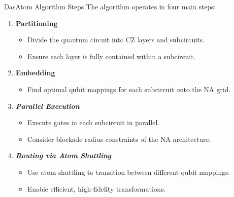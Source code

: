 \begin{frame}{DasAtom Algorithm Steps}
    The algorithm operates in four main steps:

    \begin{enumerate}
        \item \textbf{Partitioning}
            \begin{itemize}
                \item Divide the quantum circuit into CZ layers and subcircuits.
                \item Ensure each layer is fully contained within a subcircuit.
            \end{itemize}
        \item \textbf{Embedding}
            \begin{itemize}
                \item Find optimal qubit mappings for each subcircuit onto the NA grid.
            \end{itemize}
        \item \textit{\textbf{Parallel Execution}}
            \begin{itemize}
                \item Execute gates in each subcircuit in parallel.
                \item Consider blockade radius constraints of the NA architecture.
            \end{itemize}
        \item \textit{\textbf{Routing via Atom Shuttling}}
            \begin{itemize}
                \item Use atom shuttling to transition between different qubit mappings.
                \item Enable efficient, high-fidelity transformations.
            \end{itemize}
    \end{enumerate}

\end{frame}


